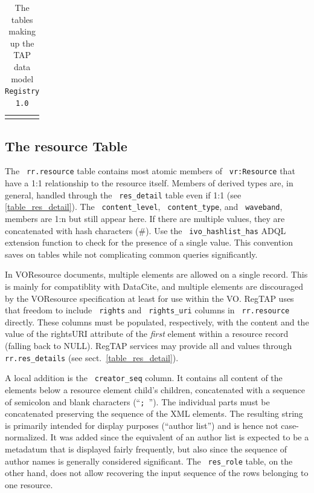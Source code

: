 \documentclass[11pt,a4paper]{ivoa}
\newcommand{\rtent}[1]{\texttt{\color{rtcolor} #1}}
\begin{document}
\begin{table}[t]
{\begin{tabular}{p{}p{}}
\sptablerule
\end{tabular}\hss}
\caption{The tables making up the TAP data model \texttt{Registry 1.0}}
\label{table:dm}
\end{table}



\subsection{The resource Table}

\label{table_resource}

The \rtent{rr.resource} table contains most atomic members of
\rtent{vr:Resource} that have a 1:1 relationship to the resource
itself.  Members of derived types are, in general, handled through 
the \rtent{res\_detail}
table even if 1:1 (see \ref{table_res_detail}).  The
\rtent{content\_level}, \rtent{content\_type}, and \rtent{waveband}, 
members are 1:n but still appear
here.  If there are multiple values, they are concatenated with hash
characters (\#).  Use the \rtent{ivo\_hashlist\_has} ADQL extension
function to check for the presence of a single value.  This convention
saves on tables while not complicating common queries significantly.

In VOResource documents, multiple  elements are allowed
on a single record.  This is mainly for compatiblity with DataCite, and
multiple  elements are discouraged by the VOResource
specification at least for use within the VO.  RegTAP uses that freedom
to include \rtent{rights} and \rtent{rights\_uri} columns in
\rtent{rr.resource} directly.  These columns must be populated,
respectively, with the content and the value of the rightsURI attribute
of the \emph{first}  element within a resource record
(falling back to NULL).  RegTAP services may provide all 
and  values through \rtent{rr.res\_details} (see
sect.~\ref{table_res_detail}).

A local addition is the \rtent{creator\_seq} column.  It contains
all content of the  elements below a resource element
 child's  children, concatenated with a
sequence of semicolon and blank characters (``\mbox{\texttt{; }}''). The
individual parts must be concatenated preserving the sequence of the XML
elements.  The resulting string is primarily intended for display
purposes (``author list'') and is hence not case-normalized.  It was
added since the equivalent of an author list is expected to be a
metadatum that is displayed fairly frequently, but also since the
sequence of author names is generally considered significant.  The
\rtent{res\_role} table, on the other hand, does not allow recovering
the input sequence of the rows belonging to one resource.
\end{document}
